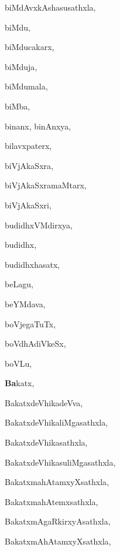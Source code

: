\begin{multicols}{3}
{\noindent
{biMdAvxkAshasusathxla}, \pageref{biMdAvxkAshasusathxla}

\noindent
{biMdu}, \pageref{biMdu}

\noindent
{biMducakarx}, \pageref{biMducakarx}

\noindent
{biMduja}, \pageref{biMduja}

\noindent
{biMdumala}, \pageref{biMdumala}

\noindent
{biMba}, \pageref{biMba}

\noindent
{binanx, binAnxya}, \pageref{binanx, binAnxya}

\noindent
{bilavxpaterx}, \pageref{bilavxpaterx}

\noindent
{biVjAkaSxra}, \pageref{biVjAkaSxra}

\noindent
{biVjAkaSxramaMtarx}, \pageref{biVjAkaSxramaMtarx}

\noindent
{biVjAkaSxri}, \pageref{biVjAkaSxri}

\noindent
{budidhxVMdirxya}, \pageref{budidhxVMdirxya}

\noindent
{budidhx}, \pageref{budidhx}

\noindent
{budidhxhasatx}, \pageref{budidhxhasatx}

\noindent
{beLagu}, \pageref{beLagu}

\noindent
{beYMdava}, \pageref{beYMdava}

\noindent
{boVjegaTuTx}, \pageref{boVjegaTuTx}

\noindent
{boVdhAdiVkeSx}, \pageref{boVdhAdiVkeSx}

\noindent
{boVLu}, \pageref{boVLu}

\noindent
{{\large\textbf{Ba}}katx}, \pageref{Bakatx}

\noindent
{BakatxdeVhikadeVva}, \pageref{BakatxdeVhikadeVva}

\noindent
{BakatxdeVhikaliMgasathxla}, \pageref{BakatxdeVhikaliMgasathxla}

\noindent
{BakatxdeVhikasathxla}, \pageref{BakatxdeVhikasathxla}

\noindent
{BakatxdeVhikasuliMgasathxla}, \pageref{BakatxdeVhikasuliMgasathxla}

\noindent
{BakatxmahAtamxyXsathxla}, \pageref{BakatxmahAtamxyXsathxla}

\noindent
{BakatxmahAtemxsathxla}, \pageref{BakatxmahAtemxsathxla}

\noindent
{BakatxmAgaRkirxyAsathxla}, \pageref{BakatxmAgaRkirxyAsathxla}

\noindent
{BakatxmAhAtamxyXsathxla}, \pageref{BakatxmAhAtamxyXsathxla}

}
\end{multicols}
